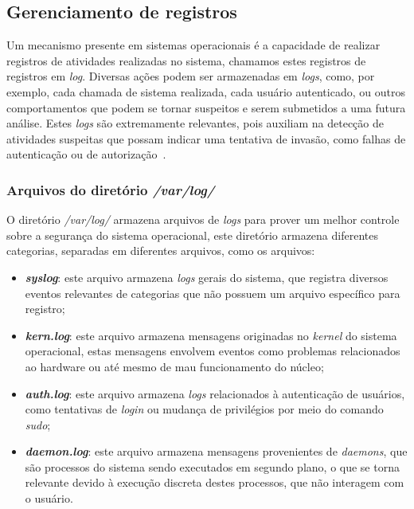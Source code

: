 \documentclass[
	12pt,				%
	oneside,   	        %
	a4paper,			%
	english,			%
	french,				%
	spanish,			%
	brazil,				%
	]{pacotes/abntex2}
\begin{document}
\subsection{Gerenciamento de registros}
Um mecanismo presente em sistemas operacionais é a capacidade de realizar registros de atividades realizadas no sistema, chamamos estes registros de registros em \textit{log}. Diversas ações podem ser armazenadas em \textit{logs}, como, por exemplo, cada chamada de sistema realizada, cada usuário autenticado, ou outros comportamentos que podem se tornar suspeitos e serem submetidos a uma futura análise. Estes \textit{logs} são extremamente relevantes, pois auxiliam na detecção de atividades suspeitas que possam indicar uma tentativa de invasão, como falhas de autenticação ou de autorização~\cite{silberschatz2015}.

\subsubsection{Arquivos do diretório \textit{/var/log/}}
O diretório \textit{/var/log/} armazena arquivos de \textit{logs} para prover um melhor controle sobre a segurança do sistema operacional, este diretório armazena diferentes categorias, separadas em diferentes arquivos, como os arquivos:

\begin{itemize}
    \item \textbf{\textit{syslog}}: este arquivo armazena \textit{logs} gerais do sistema, que registra diversos eventos relevantes de categorias que não possuem um arquivo específico para registro;
    \item \textbf{\textit{kern.log}}: este arquivo armazena mensagens originadas no \textit{kernel} do sistema operacional, estas mensagens envolvem eventos como problemas relacionados ao hardware ou até mesmo de mau funcionamento do núcleo;
    \item \textbf{\textit{auth.log}}: este arquivo armazena \textit{logs} relacionados à autenticação de usuários, como tentativas de \textit{login} ou mudança de privilégios por meio do comando \textit{sudo};
    \item \textbf{\textit{daemon.log}}: este arquivo armazena mensagens provenientes de \textit{daemons}, que são processos do sistema sendo executados em segundo plano, o que se torna relevante devido à execução discreta destes processos, que não interagem com o usuário.
\end{itemize}
\end{document}
